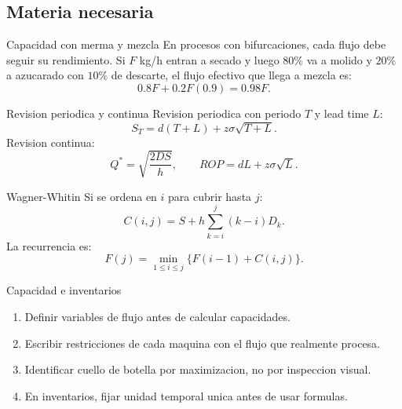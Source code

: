 \subsection{Materia necesaria}

\begin{definicion}{Capacidad con merma y mezcla}
En procesos con bifurcaciones, cada flujo debe seguir su rendimiento. Si \(F\) kg/h entran a secado y luego \(80\%\) va a molido y \(20\%\) a azucarado con \(10\%\) de descarte, el flujo efectivo que llega a mezcla es:
\[
0.8F+0.2F(0.9)=0.98F.
\]
\end{definicion}

\begin{formulas}{Revision periodica y continua}
Revision periodica con periodo \(T\) y lead time \(L\):
\[
S_T=d(T+L)+z\sigma\sqrt{T+L}.
\]
Revision continua:
\[
Q^*=\sqrt{\frac{2DS}{h}},
\qquad
ROP=dL+z\sigma\sqrt L.
\]
\end{formulas}

\begin{formulas}{Wagner-Whitin}
Si se ordena en \(i\) para cubrir hasta \(j\):
\[
C(i,j)=S+h\sum_{k=i}^{j}(k-i)D_k.
\]
La recurrencia es:
\[
F(j)=\min_{1\le i\le j}\{F(i-1)+C(i,j)\}.
\]
\end{formulas}

\begin{algoritmo}{Capacidad e inventarios}
\begin{enumerate}
    \item Definir variables de flujo antes de calcular capacidades.
    \item Escribir restricciones de cada maquina con el flujo que realmente procesa.
    \item Identificar cuello de botella por maximizacion, no por inspeccion visual.
    \item En inventarios, fijar unidad temporal unica antes de usar formulas.
\end{enumerate}
\end{algoritmo}
